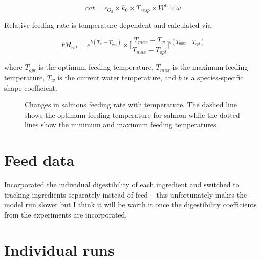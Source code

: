 \documentclass[
  a4paper,
]{article}
\begin{document}
\[
cat = \epsilon_{O_2} \times k_0 \times T_{resp} \times W^n \times \omega
\]

Relative feeding rate is temperature-dependent and calculated via:

\[
FR_{rel} = e^{b(T_w-T_{opt})} \times \bigg[\frac{T_{max}-T_w}{T_{max}-T_{opt}}\bigg]^{b(T_{max}-T_{opt})}
\]

where \(T_{opt}\) is the optimum feeding temperature, \(T_{max}\) is the
maximum feeding temperature, \(T_w\) is the current water temperature,
and \(b\) is a species-specific shape coefficient.

\begin{figure}


\caption{\label{fig-feeding-rate-with-temperature}Changes in salmons
feeding rate with temperature. The dashed line shows the optimum feeding
temperature for salmon while the dotted lines show the minimum and
maximum feeding temperatures.}

\end{figure}%

\section{Feed data}\label{feed-data}

Incorporated the individual digestibility of each ingredient and
switched to tracking ingredients separately instead of feed -- this
unfortunately makes the model run slower but I think it will be worth it
once the digestibility coefficients from the experiments are
incorporated.

\section{Individual runs}\label{individual-runs}
\end{document}
